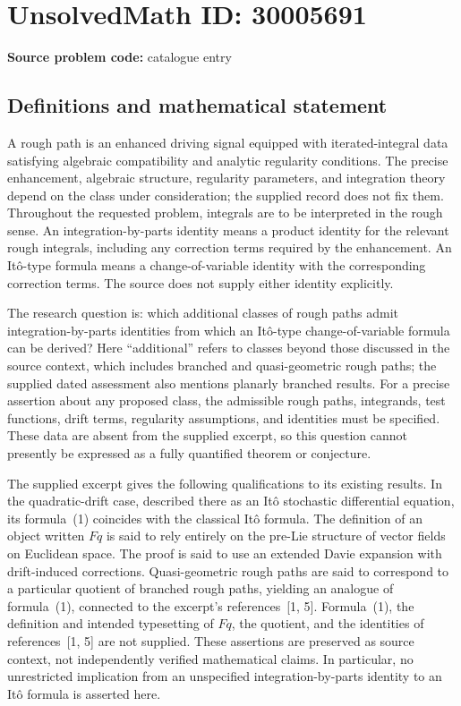 \documentclass[11pt]{article}
\begin{document}
\section*{UnsolvedMath ID: 30005691}
\textbf{Source problem code:} catalogue entry
\subsection{Definitions and mathematical statement}
A rough path is an enhanced driving signal equipped with iterated-integral data satisfying algebraic compatibility and analytic regularity conditions. The precise enhancement, algebraic structure, regularity parameters, and integration theory depend on the class under consideration; the supplied record does not fix them. Throughout the requested problem, integrals are to be interpreted in the rough sense. An integration-by-parts identity means a product identity for the relevant rough integrals, including any correction terms required by the enhancement. An It\^o-type formula means a change-of-variable identity with the corresponding correction terms. The source does not supply either identity explicitly.

The research question is: which additional classes of rough paths admit integration-by-parts identities from which an It\^o-type change-of-variable formula can be derived? Here ``additional'' refers to classes beyond those discussed in the source context, which includes branched and quasi-geometric rough paths; the supplied dated assessment also mentions planarly branched results. For a precise assertion about any proposed class, the admissible rough paths, integrands, test functions, drift terms, regularity assumptions, and identities must be specified. These data are absent from the supplied excerpt, so this question cannot presently be expressed as a fully quantified theorem or conjecture.

The supplied excerpt gives the following qualifications to its existing results. In the quadratic-drift case, described there as an It\^o stochastic differential equation, its formula~(1) coincides with the classical It\^o formula. The definition of an object written \(Fq\) is said to rely entirely on the pre-Lie structure of vector fields on Euclidean space. The proof is said to use an extended Davie expansion with drift-induced corrections. Quasi-geometric rough paths are said to correspond to a particular quotient of branched rough paths, yielding an analogue of formula~(1), connected to the excerpt's references~[1, 5]. Formula~(1), the definition and intended typesetting of \(Fq\), the quotient, and the identities of references~[1, 5] are not supplied. These assertions are preserved as source context, not independently verified mathematical claims. In particular, no unrestricted implication from an unspecified integration-by-parts identity to an It\^o formula is asserted here.
\end{document}

